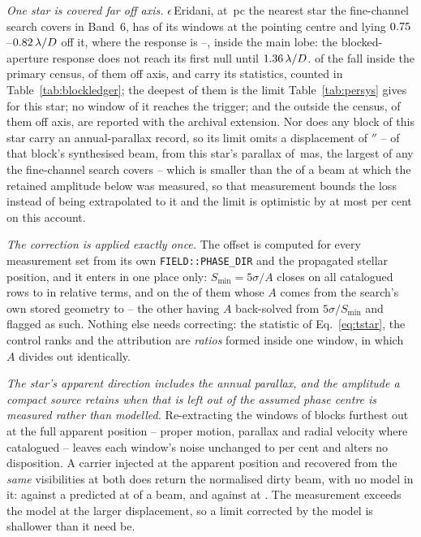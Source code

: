 \emph{One star is covered far off axis.} $\epsilon$\,Eridani, at
\BmEpsDistPc\,pc the nearest star the fine-channel search covers in
Band~6, has
\BmEpsNOn{} of its \BmEpsNWin{} windows at the pointing centre and
\BmEpsNOff{} lying $0.75$--$0.82\,\lambda/D$ off it, where the
response is \BmEpsRespLo--\BmEpsRespHi, inside the main lobe: the
blocked-aperture response does not reach its first null until
$1.36\,\lambda/D$. \BmEpsNCensus{} of the \BmEpsNWin{} fall inside the
primary census, \BmEpsNCensusOff{} of them off axis, and carry its statistics,
counted in Table~\ref{tab:blockledger}; the deepest of them is the limit
Table~\ref{tab:persys} gives for this star; no window of it reaches the
trigger; and the \BmEpsNExt{} outside the census, \ExNOffAxis{} of them off
axis, are reported with the archival extension. Nor does any block of this star carry an annual-parallax record,
so its limit omits a displacement of \ExCenPxArcsec$''$ --
\ExCenPxBeams{} of that block's synthesised beam, from this star's parallax of
\BmEpsPlxMas\,mas, the largest of any the fine-channel search covers -- which
is smaller than the
\SensPxSmallBeams{} of a beam at which the retained amplitude below was
measured, so that measurement bounds the loss instead of being extrapolated
to it and the limit is optimistic by at most \BmEpsPxBoundPct{} per cent on
this account.

\emph{The correction is applied exactly once.} The offset is computed for
every measurement set from its own \texttt{FIELD::PHASE\_DIR} and the
propagated stellar position, and it enters in one place only:
$S_{\min}=5\sigma/A$ closes on all \PbSminClosed{} catalogued rows to
\PbSminWorstRes{} in relative terms, and on the \PbSminIndep{} of them whose
$A$ comes from the search's own stored geometry to \PbSminIndepRes{} -- the
other \PbSminTaut{} having $A$ back-solved from $5\sigma/S_{\min}$ and
flagged as such. Nothing else needs correcting: the statistic of
Eq.~\ref{eq:tstar}, the control ranks and the attribution are \emph{ratios}
formed inside one window, in which $A$ divides out identically.

\emph{The star's apparent direction includes the annual parallax, and the
amplitude a compact source retains when that is left out of the assumed phase
centre is measured rather than modelled.}
Re-extracting the \SensNReextWin{} windows of \SensNReextBlock{} blocks
furthest out at the full apparent position -- proper motion, parallax and
radial velocity where catalogued -- leaves each window's noise unchanged to
\SensReextNoiseMaxPct{} per cent and alters no disposition. A carrier
injected at the apparent position and recovered from the \emph{same}
visibilities at both does return the normalised dirty beam, with no model in
it: \SensPxSmallMeas{} against a predicted \SensPxSmallPred{} at
\SensPxSmallBeams{} of a beam, and \SensPxLargeMeas{} against
\SensPxLargePred{} at \SensPxLargeBeams. The measurement exceeds the model at
the larger displacement, so a limit corrected by the model is shallower than
it need be.

